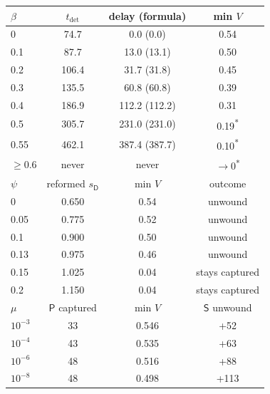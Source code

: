 \begin{tabular}{@{}lccc@{}}
\toprule
$\beta$ & $t_{\mathrm{det}}$ & delay (formula) & min $V$ \\
\midrule
0 & 74.7 & 0.0 (0.0) & 0.54 \\
0.1 & 87.7 & 13.0 (13.1) & 0.50 \\
0.2 & 106.4 & 31.7 (31.8) & 0.45 \\
0.3 & 135.5 & 60.8 (60.8) & 0.39 \\
0.4 & 186.9 & 112.2 (112.2) & 0.31 \\
0.5 & 305.7 & 231.0 (231.0) & 0.19\textsuperscript{*} \\
0.55 & 462.1 & 387.4 (387.7) & 0.10\textsuperscript{*} \\
$\ge0.6$ & never & never & $\to0$\textsuperscript{*} \\
\midrule
$\psi$ & reformed $s_{\mathsf D}$ & min $V$ & outcome \\
\midrule
0 & 0.650 & 0.54 & unwound \\
0.05 & 0.775 & 0.52 & unwound \\
0.1 & 0.900 & 0.50 & unwound \\
0.13 & 0.975 & 0.46 & unwound \\
0.15 & 1.025 & 0.04 & stays captured \\
0.2 & 1.150 & 0.04 & stays captured \\
\midrule
$\mu$ & $\mathsf P$ captured & min $V$ & $\mathsf S$ unwound \\
\midrule
$10^{-3}$ & 33 & 0.546 & +52 \\
$10^{-4}$ & 43 & 0.535 & +63 \\
$10^{-6}$ & 48 & 0.516 & +88 \\
$10^{-8}$ & 48 & 0.498 & +113 \\
\bottomrule
\end{tabular}
